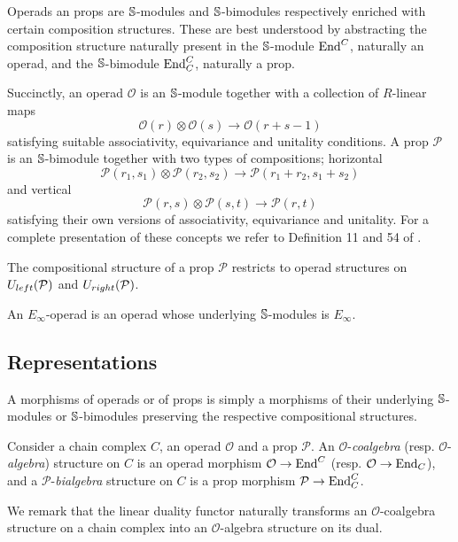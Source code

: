 Operads an props are $\S$-modules and \mbox{$\S$-bimodules} respectively enriched with certain composition structures. These are best understood by abstracting the composition structure naturally present in the $\S$-module $\End^C$, naturally an operad, and the $\S$-bimodule $\End^C_C$, naturally a prop.

Succinctly, an operad $\mathcal O$ is an $\S$-module together with a collection of $R$-linear maps
\begin{equation*}
\mathcal O(r) \otimes \mathcal O(s) \to \mathcal O(r+s-1)
\end{equation*}
satisfying suitable associativity, equivariance and unitality conditions.
A prop $\mathcal P$ is an $\S$-bimodule together with two types of compositions; horizontal
\begin{equation*}
\mathcal P(r_1, s_1) \otimes \mathcal P(r_2, s_2) \to \mathcal P(r_1 + r_2, s_1 + s_2)
\end{equation*}
and vertical
\begin{equation*}
\mathcal P(r,s) \otimes \mathcal P(s, t) \to \mathcal P(r, t)
\end{equation*}
satisfying their own versions of associativity, equivariance and unitality.
For a complete presentation of these concepts we refer to Definition 11 and 54 of \cite{Markl08}.

The compositional structure of a prop $\mathcal P$ restricts to operad structures on $\Uleft(\mathcal P)$ and $\Uright(\mathcal P)$.

An $E_\infty$-operad is an operad whose underlying $\S$-modules is $E_\infty$.

\subsection{Representations} \label{ss:representations}

A morphisms of operads or of props is simply a morphisms of their underlying $\S$-modules or $\S$-bimodules preserving the respective compositional structures.

Consider a chain complex $C$, an operad $\mathcal O$ and a prop $\mathcal P$. An $\mathcal O$-\textit{coalgebra} (resp. $\mathcal O$-\textit{algebra}) structure on $C$ is an operad morphism $\mathcal O \to \End^C$ (resp. $\mathcal O \to \End_C$), and a $\mathcal P$-\textit{bialgebra} structure on $C$ is a prop morphism $\mathcal P \to \End_C^C$.

We remark that the linear duality functor naturally transforms an $\mathcal O$-coalgebra structure on a chain complex into an $\mathcal O$-algebra structure on its dual.

